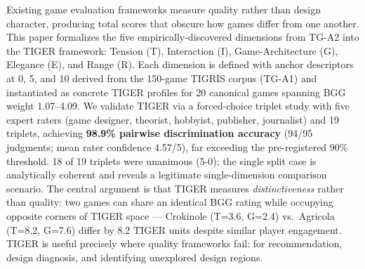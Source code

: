 Existing game evaluation frameworks measure quality rather than design character, producing
total scores that obscure how games differ from one another.
This paper formalizes the five empirically-discovered dimensions from TG-A2 into the
TIGER framework: Tension (T), Interaction (I), Game-Architecture (G), Elegance (E), and Range (R).
Each dimension is defined with anchor descriptors at 0, 5, and 10 derived from the
150-game TIGRIS corpus (TG-A1) and instantiated as concrete TIGER profiles for 20
canonical games spanning BGG weight 1.07--4.09.
We validate TIGER via a forced-choice triplet study with five expert raters
(game designer, theorist, hobbyist, publisher, journalist) and 19 triplets,
achieving \textbf{98.9\% pairwise discrimination accuracy} (94/95 judgments;
mean rater confidence 4.57/5), far exceeding the pre-registered 90\% threshold.
18 of 19 triplets were unanimous (5-0); the single split case is analytically
coherent and reveals a legitimate single-dimension comparison scenario.
The central argument is that TIGER measures \emph{distinctiveness} rather than quality:
two games can share an identical BGG rating while occupying opposite corners of
TIGER space --- Crokinole (T=3.6, G=2.4) vs.\ Agricola (T=8.2, G=7.6) differ by
8.2 TIGER units despite similar player engagement.
TIGER is useful precisely where quality frameworks fail: for recommendation,
design diagnosis, and identifying unexplored design regions.
